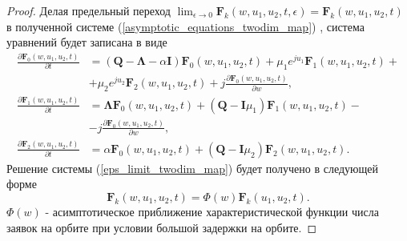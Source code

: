 \begin{proof}
	Делая предельный переход $ \lim_{\epsilon \xrightarrow{} 0}\boldsymbol{F}_{k}(w,u_{1},u_{2},t,\epsilon) = \boldsymbol{F}_{k}(w,u_{1},u_{2},t)$  в полученной системе (\ref{asymptotic_equations_twodim_map}) , система уравнений будет записана в виде
	\begin{equation} \label{eps_limit_twodim_map}
		\begin{split}
			\frac{{\partial \boldsymbol{F}_{0}(w,u_{1},u_{2},t)}}{{\partial t}} &= (\boldsymbol{Q}-\boldsymbol{\Lambda}-\alpha\boldsymbol{I})\boldsymbol{F}_{0}(w,u_{1},u_{2},t) + \mu_{1} e^{ju_{1}}\boldsymbol{F}_{1}(w,u_{1},u_{2},t)  + \\  &+ \mu_{2}e^{ju_{2}}\boldsymbol{F}_{2}(w,u_{1},u_{2},t) + j
			\frac{{\partial \boldsymbol{F}_{0}(w,u_{1},u_{2},t)}}{{\partial w}},
			\\
			\frac{{\partial \boldsymbol{F}_{1}(w,u_{1},u_{2},t)}}{{\partial t}} &= \boldsymbol{\Lambda} \boldsymbol{F}_{0}(w,u_{1},u_{2},t) +  (\boldsymbol{Q} - \boldsymbol{I}\mu_{1})\boldsymbol{F}_{1}(w,u_{1},u_{2},t) -\\ &- j
			\frac{{\partial \boldsymbol{F}_{0}(w,u_{1},u_{2},t)}}{{\partial w}},
			\\
			\frac{{\partial \boldsymbol{F}_{2}(w,u_{1},u_{2},t)}}{{\partial t}} &= \alpha \boldsymbol{F}_{0}(w,u_{1},u_{2},t) + (\boldsymbol{Q} - \boldsymbol{I}\mu_{2})\boldsymbol{F}_{2}(w,u_{1},u_{2},t).
		\end{split}
	\end{equation}   
	Решение системы (\ref{eps_limit_twodim_map}) будет получено в следующей форме
	\begin{equation} \label{solution_twodim_map}
		\boldsymbol{F}_{k}(w,u_{1},u_{2},t) = \Phi(w)\boldsymbol{F}_{k}(u_{1},u_{2},t).
	\end{equation}  
	$\Phi(w)$ - асимптотическое приближение характеристической функции числа заявок на орбите при условии большой задержки на орбите.
	

\end{proof}
